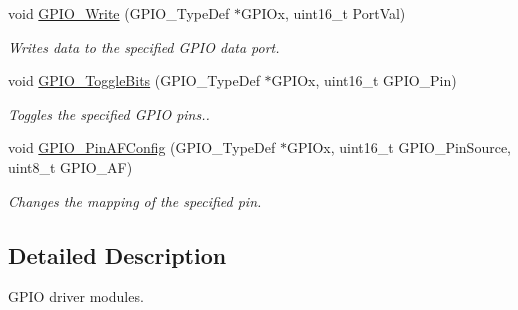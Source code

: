 \begin{DoxyCompactItemize}
void \hyperlink{group___g_p_i_o_gaa925f19c8547a00c7a0c269a84873bf9}{G\-P\-I\-O\-\_\-\-Write} (G\-P\-I\-O\-\_\-\-Type\-Def $\ast$G\-P\-I\-Ox, uint16\-\_\-t Port\-Val)
\begin{DoxyCompactList}\small\item\em Writes data to the specified G\-P\-I\-O data port. \end{DoxyCompactList}\item 
void \hyperlink{group___g_p_i_o_gac1b837c66258872740d5f89f23549ab1}{G\-P\-I\-O\-\_\-\-Toggle\-Bits} (G\-P\-I\-O\-\_\-\-Type\-Def $\ast$G\-P\-I\-Ox, uint16\-\_\-t G\-P\-I\-O\-\_\-\-Pin)
\begin{DoxyCompactList}\small\item\em Toggles the specified G\-P\-I\-O pins.. \end{DoxyCompactList}\item 
void \hyperlink{group___g_p_i_o_ga0a77617a322562ae84f8d72486032c5d}{G\-P\-I\-O\-\_\-\-Pin\-A\-F\-Config} (G\-P\-I\-O\-\_\-\-Type\-Def $\ast$G\-P\-I\-Ox, uint16\-\_\-t G\-P\-I\-O\-\_\-\-Pin\-Source, uint8\-\_\-t G\-P\-I\-O\-\_\-\-A\-F)
\begin{DoxyCompactList}\small\item\em Changes the mapping of the specified pin. \end{DoxyCompactList}\end{DoxyCompactItemize}


\subsection{Detailed Description}
G\-P\-I\-O driver modules. 

